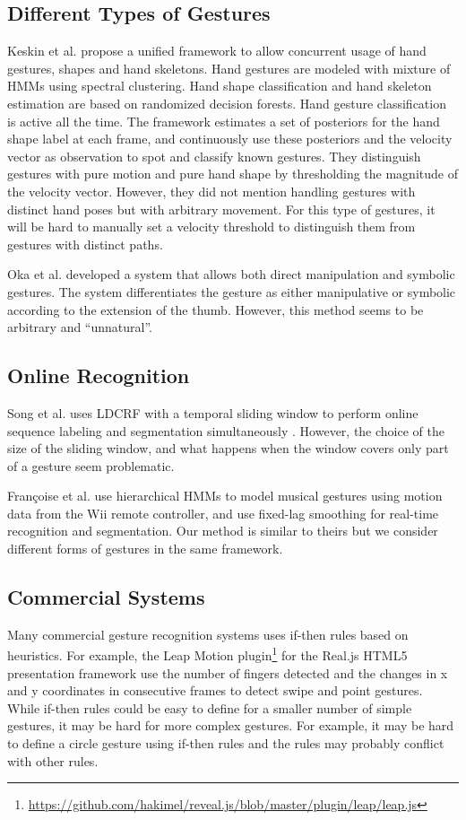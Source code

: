\documentclass[conference]{IEEEtran}
\begin{document}
\subsection{Different Types of Gestures}

Keskin et al. \cite{keskin12} propose a unified framework to allow concurrent
usage of hand gestures, shapes and hand skeletons. Hand gestures are modeled
with mixture of HMMs using spectral clustering. Hand shape classification and
hand skeleton estimation are based on randomized decision forests. Hand
gesture classification is active all the time. The framework estimates a set of
posteriors for the hand shape label at each frame, and continuously use these
posteriors and the velocity vector as observation to spot and classify known
gestures. They distinguish gestures with pure motion and pure hand shape by
thresholding the magnitude of the velocity vector. However, they did not mention
handling gestures with distinct hand poses but with arbitrary movement. For this
type of gestures, it will be hard to manually set a velocity threshold to
distinguish them from gestures with distinct paths.

Oka et al. \cite{Oka02} developed a system that
allows both direct manipulation and symbolic gestures. The system
differentiates the gesture as either manipulative or symbolic according to the extension of the thumb. 
However, this method seems to be arbitrary and ``unnatural''. 

\subsection{Online Recognition}
Song et al. uses LDCRF with a temporal sliding window to perform
online sequence labeling and segmentation simultaneously \cite{song12}. 
However, the choice of the size of the sliding window, and what happens when the
window covers only part of a gesture seem problematic.

Fran{\c{c}}oise et al. \cite{francoise11} use hierarchical HMMs to model musical
gestures using motion data from the Wii remote controller, and use fixed-lag
smoothing for real-time recognition and segmentation.
Our method is similar to theirs but we consider different forms of gestures in the
same framework.

\subsection{Commercial Systems}
Many commercial gesture recognition systems uses if-then rules based on
heuristics. For example, the Leap Motion
plugin\footnote{\url{https://github.com/hakimel/reveal.js/blob/master/plugin/leap/leap.js}} for the Real.js HTML5 presentation framework use the number of fingers
detected and the changes in x and y coordinates in consecutive frames to
detect swipe and point gestures. While if-then rules could be easy to define for
a smaller number of simple gestures, it may be hard for more complex gestures.
For example, it may be hard to define a circle gesture using if-then rules and
the rules may probably conflict with other rules.
\end{document}

